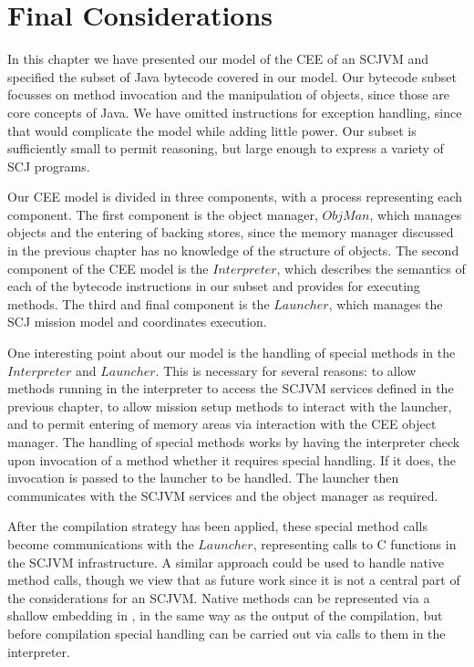 \section{Final Considerations}
\label{cee-final-considerations-section}

In this chapter we have presented our model of the CEE of an SCJVM and
specified the subset of Java bytecode covered in our model.
Our bytecode subset focusses on method invocation and the manipulation
of objects, since those are core concepts of Java.
We have omitted instructions for exception handling, since that would
complicate the model while adding little power.
Our subset is sufficiently small to permit reasoning, but large enough
to express a variety of SCJ programs.

Our CEE model is divided in three components, with a \Circus{} process
representing each component.
The first component is the object manager, $ObjMan$, which manages
objects and the entering of backing stores, since the memory manager
discussed in the previous chapter has no knowledge of the structure of
objects.
The second component of the CEE model is the $Interpreter$, which
describes the semantics of each of the bytecode instructions in our
subset and provides for executing methods.
The third and final component is the $Launcher$, which manages the SCJ
mission model and coordinates execution.

One interesting point about our model is the handling of special
methods in the $Interpreter$ and $Launcher$.
This is necessary for several reasons: to allow methods running in the
interpreter to access the SCJVM services defined in the previous
chapter, to allow mission setup methods to interact with the launcher,
and to permit entering of memory areas via interaction with the CEE
object manager.
The handling of special methods works by having the interpreter check
upon invocation of a method whether it requires special handling.
If it does, the invocation is passed to the launcher to be handled.
The launcher then communicates with the SCJVM services and the object
manager as required.

After the compilation strategy has been applied, these special method
calls become communications with the $Launcher$, representing calls to
C functions in the SCJVM infrastructure.
A similar approach could be used to handle native method calls, though
we view that as future work since it is not a central part of the
considerations for an SCJVM.
Native methods can be represented via a shallow embedding in
\Circus{}, in the same way as the output of the compilation, but
before compilation special handling can be carried out via calls to
them in the interpreter.

